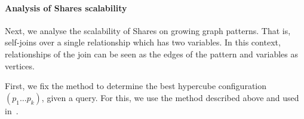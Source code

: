 

%



\paragraph{Analysis of Shares scalability}
Next, we analyse the scalability of Shares on growing graph patterns.
That is, self-joins over a single relationship which has two variables.
In this context, relationships of the join can be seen as the edges of the pattern and variables as vertices.

First, we fix the method to determine the best hypercube configuration $(p_1 \dots p_k)$, given a query.
For this, we use the method described above and used in~\cite{myria-detailed}.

